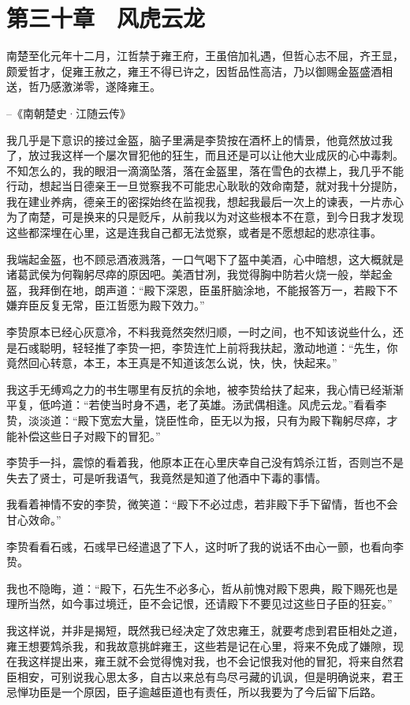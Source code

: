 \chapter{第三十章　风虎云龙}

南楚至化元年十二月，江哲禁于雍王府，王虽倍加礼遇，但哲心志不屈，齐王显，颇爱哲才，促雍王赦之，雍王不得已许之，因哲品性高洁，乃以御赐金盔盛酒相送，哲乃感激涕零，遂降雍王。

--《南朝楚史·江随云传》

我几乎是下意识的接过金盔，脑子里满是李贽按在酒杯上的情景，他竟然放过我了，放过我这样一个屡次冒犯他的狂生，而且还是可以让他大业成灰的心中毒刺。不知怎么的，我的眼泪一滴滴坠落，落在金盔里，落在雪色的衣襟上，我几乎不能行动，想起当日德亲王一旦觉察我不可能忠心耿耿的效命南楚，就对我十分提防，我在建业养病，德亲王的密探始终在监视我，想起我最后一次上的谏表，一片赤心为了南楚，可是换来的只是贬斥，从前我以为对这些根本不在意，到今日我才发现这些都深埋在心里，这是连我自己都无法觉察，或者是不愿想起的悲凉往事。

我端起金盔，也不顾忌酒液溅落，一口气喝下了盔中美酒，心中暗想，这大概就是诸葛武侯为何鞠躬尽瘁的原因吧。美酒甘冽，我觉得胸中防若火烧一般，举起金盔，我拜倒在地，朗声道：“殿下深恩，臣虽肝脑涂地，不能报答万一，若殿下不嫌弃臣反复无常，臣江哲愿为殿下效力。”

李贽原本已经心灰意冷，不料我竟然突然归顺，一时之间，也不知该说些什么，还是石彧聪明，轻轻推了李贽一把，李贽连忙上前将我扶起，激动地道：“先生，你竟然回心转意，本王，本王真是不知道该怎么说，快，快，快起来。”

我这手无缚鸡之力的书生哪里有反抗的余地，被李贽给扶了起来，我心情已经渐渐平复，低吟道：“若使当时身不遇，老了英雄。汤武偶相逢。风虎云龙。”看看李贽，淡淡道：“殿下宽宏大量，饶臣性命，臣无以为报，只有为殿下鞠躬尽瘁，才能补偿这些日子对殿下的冒犯。”

李贽手一抖，震惊的看着我，他原本正在心里庆幸自己没有鸩杀江哲，否则岂不是失去了贤士，可是听我语气，我竟然是知道了他酒中下毒的事情。

我看着神情不安的李贽，微笑道：“殿下不必过虑，若非殿下手下留情，哲也不会甘心效命。”

李贽看看石彧，石彧早已经遣退了下人，这时听了我的说话不由心一颤，也看向李贽。

我也不隐晦，道：“殿下，石先生不必多心，哲从前愧对殿下恩典，殿下赐死也是理所当然，如今事过境迁，臣不会记恨，还请殿下不要见过这些日子臣的狂妄。”

我这样说，并非是揭短，既然我已经决定了效忠雍王，就要考虑到君臣相处之道，雍王想要鸩杀我，和我故意挑衅雍王，这些若是记在心里，将来不免成了嫌隙，现在我这样提出来，雍王就不会觉得愧对我，也不会记恨我对他的冒犯，将来自然君臣相安，可别说我心思太多，自古以来总有鸟尽弓藏的讥讽，但是明确说来，君王忌惮功臣是一个原因，臣子逾越臣道也有责任，所以我要为了今后留下后路。

